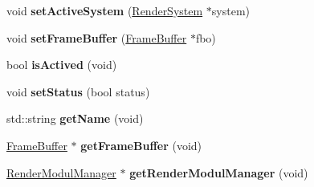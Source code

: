 \begin{DoxyCompactItemize}
\item 
\hypertarget{classEngine_1_1Technique_a021b8878960351e7c95ba7a274960d7d}{}void {\bfseries set\+Active\+System} (\hyperlink{classEngine_1_1RenderSystem}{Render\+System} $\ast$system)\label{classEngine_1_1Technique_a021b8878960351e7c95ba7a274960d7d}

\item 
\hypertarget{classEngine_1_1Technique_a42bad8582b7d05e0fa7aeb76bf0f15d0}{}void {\bfseries set\+Frame\+Buffer} (\hyperlink{classEngine_1_1FrameBuffer}{Frame\+Buffer} $\ast$fbo)\label{classEngine_1_1Technique_a42bad8582b7d05e0fa7aeb76bf0f15d0}

\item 
\hypertarget{classEngine_1_1Technique_aee86644b3fd3c3b0da1f55c91090704b}{}bool {\bfseries is\+Actived} (void)\label{classEngine_1_1Technique_aee86644b3fd3c3b0da1f55c91090704b}

\item 
\hypertarget{classEngine_1_1Technique_af5db0b4643c7f1b5f55d876a6a090a60}{}void {\bfseries set\+Status} (bool status)\label{classEngine_1_1Technique_af5db0b4643c7f1b5f55d876a6a090a60}

\item 
\hypertarget{classEngine_1_1Technique_a6b17a10cfe87cd69dcbc3ddd7925efe9}{}std\+::string {\bfseries get\+Name} (void)\label{classEngine_1_1Technique_a6b17a10cfe87cd69dcbc3ddd7925efe9}

\item 
\hypertarget{classEngine_1_1Technique_a6d45c19323de359f1adf358640bd94a2}{}\hyperlink{classEngine_1_1FrameBuffer}{Frame\+Buffer} $\ast$ {\bfseries get\+Frame\+Buffer} (void)\label{classEngine_1_1Technique_a6d45c19323de359f1adf358640bd94a2}

\item 
\hypertarget{classEngine_1_1Technique_aee5fd074fd24f670c199895a3b9533e6}{}\hyperlink{classEngine_1_1RenderModulManager}{Render\+Modul\+Manager} $\ast$ {\bfseries get\+Render\+Modul\+Manager} (void)\label{classEngine_1_1Technique_aee5fd074fd24f670c199895a3b9533e6}

\end{DoxyCompactItemize}
